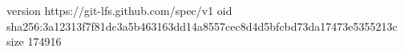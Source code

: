 version https://git-lfs.github.com/spec/v1
oid sha256:3a12313f7f81dc3a5b463163dd14a8557cec8d4d5bfcbd73da17473e5355213c
size 174916
